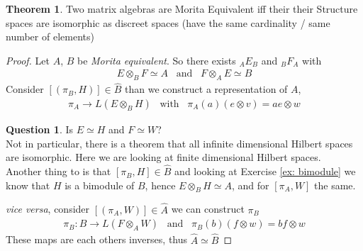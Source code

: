 \documentclass[a4paper]{article}
\theoremstyle{definition}
\theoremstyle{definition}
\newtheorem{question}{Question}
\theoremstyle{definition}
\theoremstyle{theorem}
\newtheorem{theorem}{Theorem}
\theoremstyle{theorem}
\begin{document}
\begin{theorem}
    Two matrix algebras are Morita Equivalent iff their their Structure spaces
    are isomorphic as discreet spaces (have the same cardinality / same number of elements)
\end{theorem}
\begin{proof}
    Let $A$, $B$ be \textit{Morita equivalent}. So there exists $_A E_B$ and $_B F_A$ with
    \begin{align*}
        E \otimes _B F \simeq A \;\;\; \text{and} \;\;\; F \otimes _A E \simeq B
    \end{align*}
    Consider $[(\pi _B, H)] \in \hat{B}$ than we construct a representation of $A$,
    \begin{align*}
        \pi _A \rightarrow L(E \otimes _B H)\;\;\; \text{with} \;\;\; \pi _A(a) (e \otimes v) = a e \otimes w
    \end{align*}
    \begin{question}
        Is $E \simeq H$ and $F \simeq W$? \\
        Not in particular, there is a theorem that all infinite dimensional Hilbert spaces are isomorphic.
        Here we are looking at finite dimensional Hilbert spaces.\\
        Another thing to is that $[\pi _B, H] \in \hat{B}$ and looking at Exercise \ref{ex: bimodule}
        we know that $H$ is a bimodule of $B$, hence $E \otimes _B H\simeq A$, and for $[\pi _A, W]$
        the same.
    \end{question}
    \textit{vice versa}, consider $[(\pi _A, W)] \in \hat{A}$ we can construct $\pi _B$
    \begin{align*}
        \pi _B: B \rightarrow L(F \otimes _A W) \;\;\; \text{and}\;\;\; \pi _B(b) (f\otimes w) = bf\otimes w
    \end{align*}
    These maps are each others inverses, thus $\hat{A} \simeq \hat{B}$
\end{proof}
\end{document}

